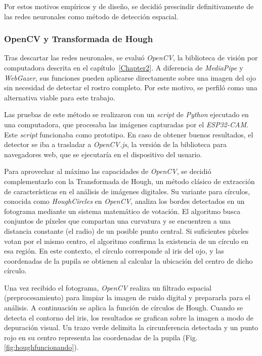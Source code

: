 Por estos motivos empíricos y de diseño, se decidió prescindir definitivamente de las redes neuronales como método de detección espacial.

\subsubsection{OpenCV y Transformada de Hough}

Tras descartar las redes neuronales, se evaluó \emph{OpenCV}, la biblioteca de visión por computadora descrita en el capítulo~\ref{Chapter2}. A diferencia de \emph{MediaPipe} y \emph{WebGazer}, sus funciones pueden aplicarse directamente sobre una imagen del ojo sin necesidad de detectar el rostro completo. Por este motivo, se perfiló como una alternativa viable para este trabajo.

Las pruebas de este método se realizaron con un \emph{script} de \emph{Python} ejecutado en una computadora, que procesaba las imágenes capturadas por el \emph{ESP32-CAM}. Este \emph{script} funcionaba como prototipo. En caso de obtener buenos resultados, el detector se iba a trasladar a \emph{OpenCV.js}, la versión de la biblioteca para navegadores web, que se ejecutaría en el dispositivo del usuario.

Para aprovechar al máximo las capacidades de \emph{OpenCV}, se decidió complementarlo con la Transformada de Hough, un método clásico de extracción de características en el análisis de imágenes digitales. Su variante para círculos, conocida como \emph{HoughCircles} en \emph{OpenCV}, analiza los bordes detectados en un fotograma mediante un sistema matemático de votación. El algoritmo busca conjuntos de píxeles que compartan una curvatura y se encuentren a una distancia constante (el radio) de un posible punto central. Si suficientes píxeles votan por el mismo centro, el algoritmo confirma la existencia de un círculo en esa región. En este contexto, el círculo corresponde al iris del ojo, y las coordenadas de la pupila se obtienen al calcular la ubicación del centro de dicho círculo.

Una vez recibido el fotograma, \emph{OpenCV} realiza un filtrado espacial (preprocesamiento) para limpiar la imagen de ruido digital y prepararla para el análisis. A continuación se aplica la función de círculos de Hough. Cuando se detecta el contorno del iris, los resultados se grafican sobre la imagen a modo de depuración visual. Un trazo verde delimita la circunferencia detectada y un punto rojo en su centro representa las coordenadas de la pupila (Fig. \ref{fig:houghfuncionando}).

